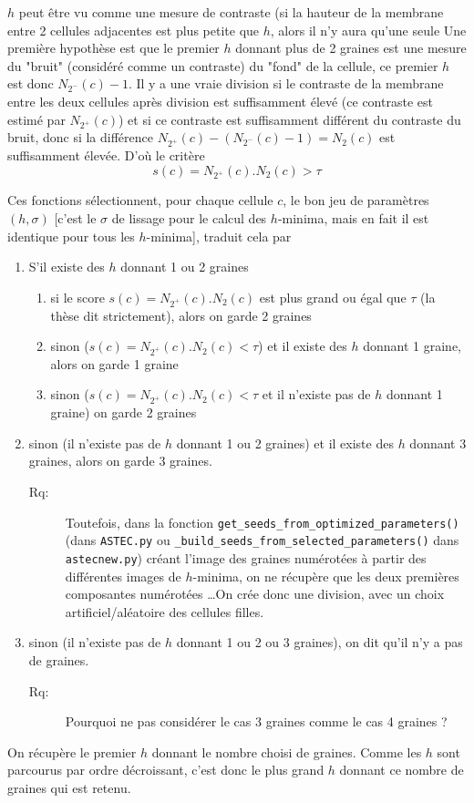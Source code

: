\documentclass{article}
\newenvironment{remarque}{\color{red}\begin{description}\item[Rq:]}
{\end{description}\color{black}}
\begin{document}
$h$ peut \^etre vu comme une mesure de contraste (si la hauteur de la membrane entre 2 cellules adjacentes est plus petite que $h$, alors il n'y aura qu'une seule 
Une premi\`ere hypoth\`ese est que le premier $h$ donnant plus de 2 graines est une mesure du "bruit" (consid\'er\'e comme un contraste) du "fond" de la cellule, ce premier $h$ est donc $N_{2^{-}}(c) - 1$. Il y a une vraie division si le contraste de la membrane entre les deux cellules apr\`es division est suffisamment \'elev\'e (ce contraste est estim\'e par $N_{2^{+}}(c)$) et si ce contraste est suffisamment diff\'erent du contraste du bruit, donc si la diff\'erence $N_{2^{+}}(c) - (N_{2^{-}}(c) - 1) = N_{2}(c)$ est suffisamment \'elev\'ee. D'o\`u le crit\`ere
\begin{equation}
s(c) = N_{2^{+}}(c) . N_{2}(c) > \tau
\end{equation}


Ces fonctions s\'electionnent, pour chaque cellule $c$, le bon jeu de param\`etres $(h,\sigma)$ [c'est le $\sigma$ de lissage pour le calcul des $h$-minima, mais en fait il est identique pour tous les $h$-minima], traduit cela par
\begin{enumerate}
\itemsep -1ex
\item S'il existe des $h$ donnant 1 ou 2 graines
\begin{enumerate}
\itemsep -0.5ex
\item si le score $s(c) = N_{2^{+}}(c) . N_2(c)$ est plus grand ou \'egal que $\tau$ (la th\`ese dit strictement), alors on garde 2 graines
\item sinon ($s(c) = N_{2^{+}}(c) . N_2(c) <\tau$) et il existe des $h$ donnant 1 graine, alors on garde 1 graine
\item sinon ($s(c) = N_{2^{+}}(c) . N_2(c) <\tau$ et il n'existe pas de $h$ donnant 1 graine) on garde 2 graines
\end{enumerate}
\item sinon (il n'existe pas de $h$ donnant 1 ou 2 graines) et il existe des $h$ donnant 3 graines, alors on garde 3 graines.
\begin{remarque}
Toutefois, dans la fonction \verb|get_seeds_from_optimized_parameters()| (dans \verb|ASTEC.py| ou \verb|_build_seeds_from_selected_parameters()| dans \verb|astecnew.py|)
cr\'eant l'image des graines num\'erot\'ees \`a partir des diff\'erentes images de $h$-minima, on ne r\'ecup\`ere que les deux premi\`eres composantes num\'erot\'ees \ldots On cr\'ee donc une division, avec un choix artificiel/al\'eatoire des cellules filles.
\end{remarque}
\item sinon  (il n'existe pas de $h$ donnant 1 ou 2 ou 3 graines), on dit qu'il n'y a pas de graines.
\begin{remarque}
Pourquoi ne pas consid\'erer le cas 3 graines comme le cas 4 graines ?
\end{remarque}
\end{enumerate}
On r\'ecup\`ere le premier $h$ donnant le nombre choisi de graines. Comme les $h$ sont parcourus par ordre d\'ecroissant, c'est donc le plus grand $h$ donnant ce nombre de graines qui est retenu.
\end{document}
